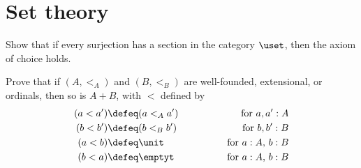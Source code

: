 \begin{coqdoccode}
\end{coqdoccode}
\section{Set theory}




Show that if every surjection has a section in the category $\uset$, then the
axiom of choice holds.



Prove that if $(A, <_{A})$ and $(B, <_{B})$ are well-founded, extensional,
or ordinals, then so is $A + B$, with $<$ defined by
\begin{alignat*}{3}
  (a < a') &\defeq (a <_{A} a') &\qquad\qquad \text{for $a, a' : A$} \\
  (b < b') &\defeq (b <_{B} b') &\qquad\qquad \text{for $b, b' : B$} \\
  (a < b) &\defeq \unit &\qquad\qquad \text{for $a: A$, $b : B$} \\
  (b < a) &\defeq \emptyt &\qquad\qquad \text{for $a : A$, $b : B$}
\end{alignat*}



